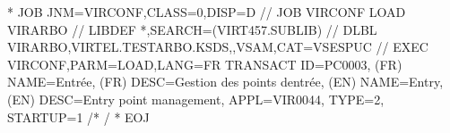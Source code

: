 \documentclass[letterpaper,10pt,english]{sphinxmanual}
\begin{document}
\begin{sphinxVerbatim}[commandchars=\\\{\}]
* \PYGZdl{}\PYGZdl{} JOB JNM=VIRCONF,CLASS=0,DISP=D
// JOB VIRCONF LOAD VIRARBO
// LIBDEF *,SEARCH=(VIRT457.SUBLIB)
// DLBL VIRARBO,\PYGZsq{}VIRTEL.TESTARBO.KSDS\PYGZsq{},,VSAM,CAT=VSESPUC
// EXEC VIRCONF,PARM=\PYGZsq{}LOAD,LANG=FR\PYGZsq{}
        TRANSACT ID=PC\PYGZhy{}0003, \PYGZhy{}
        (FR) NAME=\PYGZsq{}Entrée\PYGZsq{}, \PYGZhy{}
        (FR) DESC=\PYGZdq{}Gestion des points d\PYGZsq{}entrée\PYGZdq{}, \PYGZhy{}
        (EN) NAME=\PYGZsq{}Entry\PYGZsq{}, \PYGZhy{}
        (EN) DESC=\PYGZsq{}Entry point management\PYGZsq{}, \PYGZhy{}
        APPL=VIR0044, \PYGZhy{}
        TYPE=2, \PYGZhy{}
        STARTUP=1
/*
/\PYGZam{}
* \PYGZdl{}\PYGZdl{} EOJ
\end{sphinxVerbatim}

\end{document}
